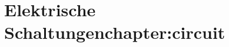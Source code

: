 %
%
%
%
\chapter{Elektrische Schaltungen{chapter:circuit}}
\begin{refsection}




%
%

\printbibliography[heading=subbibliography]
\end{refsection}
